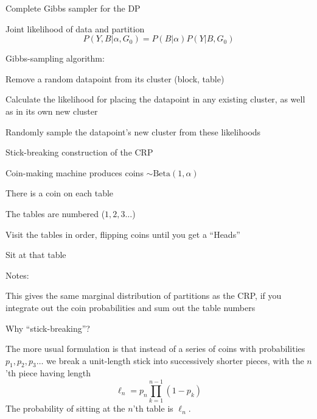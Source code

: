 \documentclass{beamer}
\begin{document}
\begin{frame}{Complete Gibbs sampler for the DP}

Joint likelihood of data and partition
\[
P(Y,B|\alpha,G_0) = P(B|\alpha) P(Y|B,G_0)
\]

Gibbs-sampling algorithm:
\itemb
\item Remove a random datapoint from its cluster (block, table)
\item Calculate the likelihood for placing the datapoint in any existing cluster, as well as in its own new cluster
\item Randomly sample the datapoint's new cluster from these likelihoods
\iteme

\end{frame}



\begin{frame}{Stick-breaking construction of the CRP}

\itemb
\item Coin-making machine produces coins $\sim \mbox{Beta}(1,\alpha)$
\item There is a coin on each table
\item The tables are numbered ($1, 2, 3 \ldots$)
\item Visit the tables in order, flipping coins until you get a ``Heads''
\item Sit at that table
\iteme

Notes:
\itemb
\item This gives the same marginal distribution of partitions as the CRP, if you integrate out the coin probabilities and sum out the table numbers
\iteme

\end{frame}


\begin{frame}{Why ``stick-breaking''?}

The more usual formulation is that instead of a series of coins with probabilities $p_1,p_2,p_3 \ldots$
we break a unit-length stick into successively shorter pieces, with the $n$'th piece having length
\[
\ell_n = p_n \prod_{k=1}^{n-1} (1 - p_k)
\]
The probability of sitting at the $n$'th table is $\ell_n$.

\end{frame}
\end{document}
